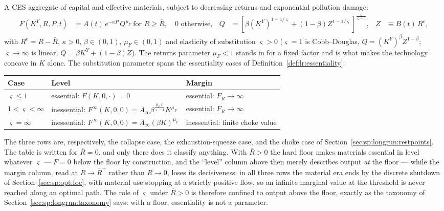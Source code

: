  A CES aggregate of capital and effective materials, subject to decreasing returns and exponential pollution damage:
\begin{align}
F\left(K^Y,R,P,t\right) &= A(t)\,e^{-\kappa P}\,Q^{\mu_F}\ \text{for }R\ge\bar R,\quad 0\text{ otherwise},
&
Q &= \left[\beta\left(K^Y\right)^{1-1/\varsigma}+\left(1-\beta\right)Z^{1-1/\varsigma}\right]^{\frac{\varsigma}{\varsigma-1}},
&
Z &\equiv B(t)\,R^{e},
\label{eq:app:wh:F}
\end{align}
with $R^e=R-\bar R$, $\kappa>0$, $\beta\in\left(0,1\right)$, $\mu_F\in\left(0,1\right)$ and elasticity of substitution $\varsigma>0$ ($\varsigma=1$ is Cobb--Douglas, $Q=\left(K^Y\right)^{\beta}Z^{1-\beta}$; $\varsigma\to\infty$ is linear, $Q=\beta K^Y+\left(1-\beta\right)Z$). The returns parameter $\mu_F<1$ stands in for a fixed factor and is what makes the technology concave in $K$ alone. The substitution parameter spans the essentiality cases of Definition~\ref{def:lr:essentiality}:
\begin{center}
\begin{tabular}{lll}
\toprule
Case & Level & Margin \\
\midrule
$\varsigma\le1$ & essential: $F\left(K,0,\cdot\right)=0$ & essential: $F_R\to\infty$ \\
$1<\varsigma<\infty$ & inessential: $F^\infty\left(K,0,0\right)=A_\infty\beta^{\frac{\mu_F\varsigma}{\varsigma-1}}K^{\mu_F}$ & essential: $F_R\to\infty$ \\
$\varsigma=\infty$ & inessential: $F^\infty\left(K,0,0\right)=A_\infty\left(\beta K\right)^{\mu_F}$ & inessential: finite choke value \\
\bottomrule
\end{tabular}
\end{center}
The three rows are, respectively, the collapse case, the exhaustion-squeeze case, and the choke case of Section~\ref{sec:sp:longrun:restpoints}. The table is written for $\bar R=0$, and only there does it classify anything. With $\bar R>0$ the hard floor makes materials essential in level whatever $\varsigma$ --- $F=0$ below the floor by construction, and the ``level'' column above then merely describes output \emph{at} the floor --- while the margin column, read at $R\to\bar R^{+}$ rather than $R\to0$, loses its decisiveness: in all three rows the material era ends by the discrete shutdown of Section~\ref{sec:sp:opt:foc}, with material use stopping at a strictly positive flow, so an infinite marginal value at the threshold is never reached along an optimal path. The role of $\varsigma$ under $\bar R>0$ is therefore confined to output above the floor, exactly as the taxonomy of Section~\ref{sec:sp:longrun:taxonomy} says: with a floor, essentiality is not a parameter.

